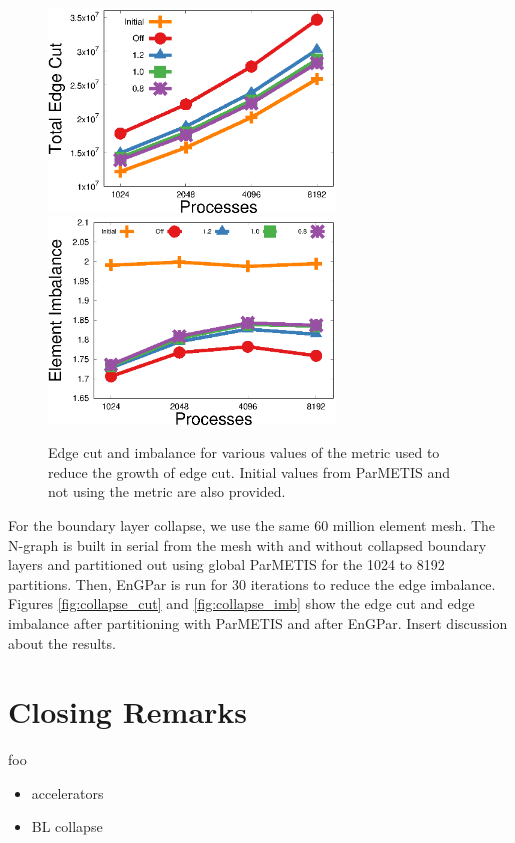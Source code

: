 \documentclass[conference]{IEEEtran}
\begin{document}
\begin{figure}[!ht]
  \centering
  \includegraphics[width=3in]{plots/aepw_edgeCut_collapse_results/ecut_v_cores}
  \includegraphics[width=3in]{plots/aepw_edgeCut_collapse_results/eimb_v_cores}
  \caption{Edge cut and imbalance for various values of the metric used to reduce the growth of edge cut. Initial values from ParMETIS and not using the metric are also provided.}
  \label{fig:metric_cut}
\end{figure}

For the boundary layer collapse, we use the same 60 million element mesh. The N-graph is
built in serial from the mesh with and without
collapsed boundary layers and partitioned out using global ParMETIS for the 1024 to 8192 partitions.
Then, EnGPar is run for 30 iterations to reduce the edge imbalance. Figures \ref{fig:collapse_cut} and
\ref{fig:collapse_imb} show the edge cut and edge imbalance after partitioning with
ParMETIS and after EnGPar. {\color{red} Insert discussion about the results.} 

\section{Closing Remarks}
foo

\begin{itemize}
\item accelerators
\item BL collapse
\end{itemize}



\end{document}

